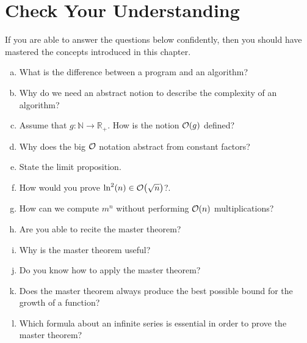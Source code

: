 \section{Check Your Understanding}
If you are able to answer the questions below confidently, then you should have mastered the concepts
introduced in this chapter.
\begin{enumerate}[(a)]
\item What is the difference between a program and an algorithm?
\item Why do we need an abstract notion to describe the complexity of an algorithm?  
\item Assume that $g:\mathbb{N} \rightarrow \mathbb{R}_+$.  How is the notion $\mathcal{O}(g)$ defined?
\item Why does the big $\mathcal{O}$ notation abstract from constant factors?  
\item State the limit proposition.
\item How would you prove $\ln^2(n) \in \mathcal{O}\bigl(\sqrt{n}\bigr)$?.
\item How can we compute $m^n$ without performing $\mathcal{O}(n)$ multiplications?
\item Are you able to recite the master theorem?
\item Why is the master theorem useful?
\item Do you know how to apply the master theorem?
\item Does the master theorem always produce the best possible bound for the growth of a function?  
\item Which formula about an infinite series is essential in order to prove the master theorem?
\end{enumerate}

